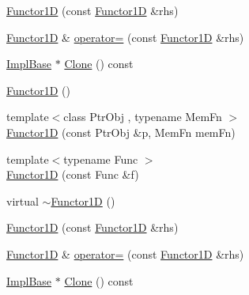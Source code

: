 \begin{DoxyCompactItemize}
\item 
\mbox{\hyperlink{classROOT_1_1Math_1_1Functor1D_a3323053da6385e3168b80163b266c600}{Functor1D}} (const \mbox{\hyperlink{classROOT_1_1Math_1_1Functor1D}{Functor1D}} \&rhs)
\item 
\mbox{\hyperlink{classROOT_1_1Math_1_1Functor1D}{Functor1D}} \& \mbox{\hyperlink{classROOT_1_1Math_1_1Functor1D_a723dff64cd3d4e53174624fa56f30a18}{operator=}} (const \mbox{\hyperlink{classROOT_1_1Math_1_1Functor1D}{Functor1D}} \&rhs)
\item 
\mbox{\hyperlink{classROOT_1_1Math_1_1Functor1D_a1ade2017edb7db0cbaf9a27a864f4dd3}{Impl\+Base}} $\ast$ \mbox{\hyperlink{classROOT_1_1Math_1_1Functor1D_af77ece084fc56e41c06e32e0f78a88a9}{Clone}} () const
\item 
\mbox{\hyperlink{classROOT_1_1Math_1_1Functor1D_ad3e410215d5ac30310dedb841bf6a88f}{Functor1D}} ()
\item 
{\footnotesize template$<$class Ptr\+Obj , typename Mem\+Fn $>$ }\\\mbox{\hyperlink{classROOT_1_1Math_1_1Functor1D_a6aee539fa2657228e99a1fc542f9ff9e}{Functor1D}} (const Ptr\+Obj \&p, Mem\+Fn mem\+Fn)
\item 
{\footnotesize template$<$typename Func $>$ }\\\mbox{\hyperlink{classROOT_1_1Math_1_1Functor1D_ac200eefbe8571f022f6b6a5d79fc7855}{Functor1D}} (const Func \&f)
\item 
virtual \mbox{\hyperlink{classROOT_1_1Math_1_1Functor1D_a270ac3bfa816f778226caad0e6731a5f}{$\sim$\+Functor1D}} ()
\item 
\mbox{\hyperlink{classROOT_1_1Math_1_1Functor1D_a3323053da6385e3168b80163b266c600}{Functor1D}} (const \mbox{\hyperlink{classROOT_1_1Math_1_1Functor1D}{Functor1D}} \&rhs)
\item 
\mbox{\hyperlink{classROOT_1_1Math_1_1Functor1D}{Functor1D}} \& \mbox{\hyperlink{classROOT_1_1Math_1_1Functor1D_a723dff64cd3d4e53174624fa56f30a18}{operator=}} (const \mbox{\hyperlink{classROOT_1_1Math_1_1Functor1D}{Functor1D}} \&rhs)
\item 
\mbox{\hyperlink{classROOT_1_1Math_1_1Functor1D_a1ade2017edb7db0cbaf9a27a864f4dd3}{Impl\+Base}} $\ast$ \mbox{\hyperlink{classROOT_1_1Math_1_1Functor1D_af77ece084fc56e41c06e32e0f78a88a9}{Clone}} () const
\end{DoxyCompactItemize}


